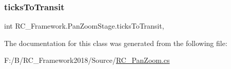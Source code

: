 \mbox{\label{class_r_c___framework_1_1_pan_zoom_stage_a8377755e226ef4ad9b73fa082eebb569}} 
\subsubsection{\texorpdfstring{ticks\+To\+Transit}{ticksToTransit}}
{\footnotesize\ttfamily int R\+C\+\_\+\+Framework.\+Pan\+Zoom\+Stage.\+ticks\+To\+Transit\hspace{0.3cm}{\ttfamily [get]}, {\ttfamily [set]}}



The documentation for this class was generated from the following file\+:\begin{DoxyCompactItemize}
\item 
F\+:/\+B/\+R\+C\+\_\+\+Framework2018/\+Source/\mbox{\hyperlink{_r_c___pan_zoom_8cs}{R\+C\+\_\+\+Pan\+Zoom.\+cs}}\end{DoxyCompactItemize}

